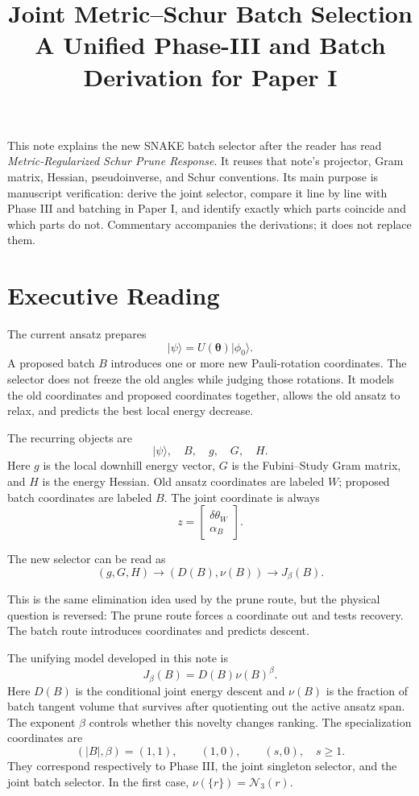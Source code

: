 \documentclass[10pt,twocolumn]{article}
\title{Joint Metric--Schur Batch Selection\\
\large A Unified Phase-III and Batch Derivation for Paper I}
\author{}
\date{}
\newcommand{\ket}[1]{|#1\rangle}
\begin{document}
\maketitle
\vspace{-1.3em}

This note explains the new SNAKE batch selector after the reader has read
\emph{Metric-Regularized Schur Prune Response}. It reuses that note's
projector, Gram matrix, Hessian, pseudoinverse, and Schur conventions. Its main
purpose is manuscript verification: derive the joint selector, compare it
line by line with Phase III and batching in Paper I, and identify exactly which
parts coincide and which parts do not. Commentary accompanies the derivations;
it does not replace them.

\section*{Executive Reading}

The current ansatz prepares
\[
\ket{\psi}=U(\bm\theta)\ket{\phi_0}.
\]
A proposed batch \(B\) introduces one or more new Pauli-rotation coordinates.
The selector does not freeze the old angles while judging those rotations. It
models the old coordinates and proposed coordinates together, allows the old
ansatz to relax, and predicts the best local energy decrease.

The recurring objects are
\[
\boxed{\ket{\psi},\quad B,\quad g,\quad G,\quad H.}
\]
Here \(g\) is the local downhill energy vector, \(G\) is the Fubini--Study
Gram matrix, and \(H\) is the energy Hessian. Old ansatz coordinates are
labeled \(W\); proposed batch coordinates are labeled \(B\). The joint
coordinate is always
\[
z=
\begin{bmatrix}
\delta\theta_W\\
\alpha_B
\end{bmatrix}.
\]

The new selector can be read as
\[
\boxed{
(g,G,H)\longrightarrow(D(B),\nu(B))\longrightarrow J_\beta(B).
}
\]

This is the same elimination idea used by the prune route, but the physical
question is reversed:
The prune route forces a coordinate out and tests recovery. The batch route
introduces coordinates and predicts descent.

The unifying model developed in this note is
\begin{equation}
\boxed{
J_\beta(B)=D(B)\nu(B)^\beta.}
\label{eq:master-unified-value}
\end{equation}
Here \(D(B)\) is the conditional joint energy descent and \(\nu(B)\) is the
fraction of batch tangent volume that survives after quotienting out the active
ansatz span. The exponent \(\beta\) controls whether this novelty changes
ranking. The specialization coordinates are
\[
(|B|,\beta)=(1,1),\qquad(1,0),\qquad(s,0),\quad s\ge1.
\]
They correspond respectively to Phase III, the joint singleton selector, and
the joint batch selector. In the first case,
\(\nu(\{r\})=\mathcal N_3(r)\).
\end{document}
